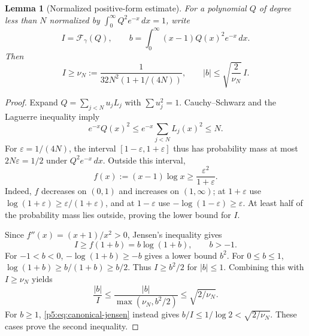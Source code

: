 \documentclass[11pt,a4paper]{article}
\newtheorem{lemma}[theorem]{Lemma}
\theoremstyle{definition}
\theoremstyle{remark}
\numberwithin{equation}{section}
\begin{document}
\begin{lemma}[Normalized positive-form estimate]\label{p5:lem:canonical-energy}
For a polynomial $Q$ of degree less than $N$ normalized by
$\int_0^\infty Q^2e^{-x}\,dx=1$, write
\[
 I=\mathcal F_\gamma(Q),\qquad
 b=\int_0^\infty(x-1)Q(x)^2e^{-x}\,dx.
\]
Then
\begin{equation}\label{p5:eq:canonical-energy-bound}
 I\geq\nu_N:=\frac1{32N^2(1+1/(4N))},\qquad
 |b|\leq\sqrt{\frac2{\nu_N}}\,I.
\end{equation}
\end{lemma}
\begin{proof}
Expand $Q=\sum_{j<N}u_jL_j$ with $\sum u_j^2=1$.
Cauchy--Schwarz and the Laguerre inequality imply
\[
 e^{-x}Q(x)^2\leq e^{-x}\sum_{j<N}L_j(x)^2\leq N.
\]
For $\varepsilon=1/(4N)$, the interval
$[1-\varepsilon,1+\varepsilon]$ thus has probability mass at most
$2N\varepsilon=1/2$ under $Q^2e^{-x}\,dx$.
Outside this interval,
\[
 f(x):=(x-1)\log x\geq\frac{\varepsilon^2}{1+\varepsilon}.
\]
Indeed, $f$ decreases on $(0,1)$ and increases on $(1,\infty)$;
at $1+\varepsilon$ use
$\log(1+\varepsilon)\geq\varepsilon/(1+\varepsilon)$,
and at $1-\varepsilon$ use
$-\log(1-\varepsilon)\geq\varepsilon$.
At least half of the probability mass lies outside, proving the
lower bound for $I$.

Since $f''(x)=(x+1)/x^2>0$, Jensen's inequality gives
\begin{equation}\label{p5:eq:canonical-jensen}
 I\geq f(1+b)=b\log(1+b),\qquad b>-1.
\end{equation}
For $-1<b<0$, $-\log(1+b)\geq-b$ gives a lower bound $b^2$.
For $0\leq b\leq1$, $\log(1+b)\geq b/(1+b)\geq b/2$.
Thus $I\geq b^2/2$ for $|b|\leq1$.  Combining this with
$I\geq\nu_N$ yields
\[
 \frac{|b|}{I}\leq
 \frac{|b|}{\max(\nu_N,b^2/2)}\leq\sqrt{2/\nu_N}.
\]
For $b\geq1$, \eqref{p5:eq:canonical-jensen} instead gives
$b/I\leq1/\log2<\sqrt{2/\nu_N}$.  These cases prove the
second inequality.
\end{proof}
\end{document}
